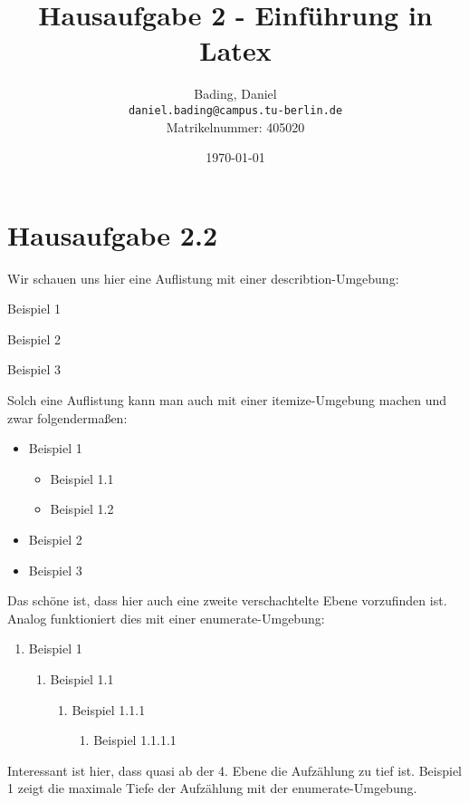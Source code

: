 \documentclass{article}
\title{Hausaufgabe 2 - Einführung in Latex}
\author{
  Bading, Daniel\\
  \texttt{daniel.bading@campus.tu-berlin.de}\\
  Matrikelnummer: 405020
  }
\date{\today}
\begin{document}
\maketitle

\newpage

\tableofcontents

\newpage


\section{Hausaufgabe 2.2}

Wir schauen uns hier eine Auflistung mit einer describtion-Umgebung: 
\begin{description}
\item Beispiel 1
\item Beispiel 2
\item Beispiel 3
\end{description} 
Solch eine Auflistung kann man auch mit einer itemize-Umgebung machen und zwar folgendermaßen: 
\begin{itemize}
\item Beispiel 1
\begin{itemize}
\item Beispiel 1.1
\item Beispiel 1.2
\end{itemize}
\item Beispiel 2
\item Beispiel 3
\end{itemize}
Das schöne ist, dass hier auch eine zweite verschachtelte Ebene vorzufinden ist. \\
Analog funktioniert dies mit einer enumerate-Umgebung: 
\begin{enumerate}
\item Beispiel 1
\begin{enumerate}
\item Beispiel 1.1
\begin{enumerate}
\item Beispiel 1.1.1
\begin{enumerate}
\item Beispiel 1.1.1.1

\end{enumerate}

\end{enumerate}

\end{enumerate}

\end{enumerate}
Interessant ist hier, dass quasi ab der 4. Ebene die Aufzählung zu tief ist. Beispiel 1 zeigt die maximale Tiefe der Aufzählung mit der enumerate-Umgebung. \\
\end{document}
